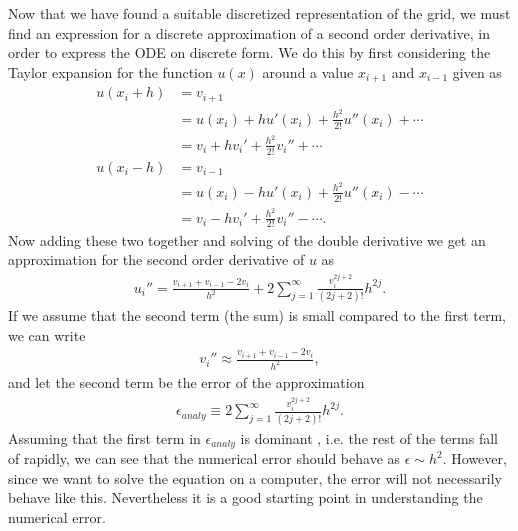 \documentclass[twocolumn]{aastex62}
\begin{document}
Now that we have found a suitable discretized representation of the grid, we must find an expression for a discrete approximation of a second order derivative, in order to express the ODE on discrete form. We do this by first considering the Taylor expansion for the function $u(x)$ around a value $x_{i+1} $ and $x_{i-1}$ given as
\begin{align*}
	u(x_i + h) &= v_{i+1} \\
	&= u(x_i) + hu'(x_i) + \frac{h^2}{2!}u''(x_i) +\cdots\\
	&= v_i + hv_i' + \frac{h^2}{2!}v_i'' + \cdots\\
	u(x_i - h) &= v_{i-1} \\
	& = u(x_i) - hu'(x_i) + \frac{h^2}{2!}u''(x_i) -\cdots\\
	&= v_i - hv_i' + \frac{h^2}{2!}v_i'' - \cdots.
\end{align*} 
Now adding these two together and solving of the double derivative we get an approximation for the second order derivative of $u$ as 
\begin{align}
	u_i'' = \frac{v_{i+1} + v_{i-1} - 2v_i}{h^2} + 2\sum^\infty_{j=1} \frac{v_i^{2j+2}}{(2j + 2)!}h^{2j}.
\end{align}
If we assume that the second term (the sum) is small compared to the first term, we can write 
\begin{align}
	v_i''\approx \frac{v_{i+1} + v_{i-1} - 2v_i}{h^2},
\end{align}
and let the second term be the error of the approximation
\begin{align}
	\epsilon_{analy} \equiv 2\sum^\infty_{j=1} \frac{v_i^{2j+2}}{(2j + 2)!}h^{2j}.
	\label{eq:analy_error}
\end{align} Assuming that the first term in $\epsilon_{analy}$ is dominant , i.e. the rest of the terms fall of rapidly, we can see that the numerical error should behave as $\epsilon\sim h^2$. However, since we want to solve the equation on a computer, the error will not necessarily behave like this. Nevertheless it is a good starting point in understanding the numerical error. 
\end{document}
